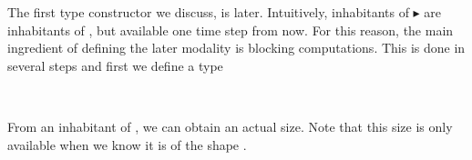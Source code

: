 
The first type constructor we discuss, is later.
Intuitively, inhabitants of $\blacktriangleright$  are inhabitants of , but available one time step from now.
For this reason, the main ingredient of defining the later modality is blocking computations.
This is done in several steps and first we define a type 

\begin{code}%
\>[0]\AgdaSpace{}%
\AgdaSpace{}%
\AgdaSymbol{(}\AgdaSpace{}%
\AgdaSymbol{:}\AgdaSpace{}%
\AgdaSymbol{)}\AgdaSpace{}%
\AgdaSymbol{:}\AgdaSpace{}%
\AgdaSpace{}%
\<%
\\
\>[0][@{}l@{\AgdaIndent{0}}]%
\>[2]\AgdaOperator{\AgdaInductiveConstructor{[\AgdaUnderscore{}]}}\AgdaSpace{}%
\AgdaSymbol{:}\AgdaSpace{}%
\AgdaSymbol{(}\AgdaSpace{}%
\AgdaSymbol{:}\AgdaSpace{}%
\AgdaSpace{}%
\AgdaSymbol{)}\AgdaSpace{}%
\AgdaSpace{}%
\AgdaSpace{}%
\<%
\end{code}

From an inhabitant of , we can obtain an actual size.
Note that this size is only available when we know it is of the shape \IC{[}  \IC{]}.

\begin{code}%
\>[0]\AgdaSpace{}%
\AgdaSymbol{:}\AgdaSpace{}%
\AgdaSpace{}%
\AgdaSymbol{\{}\AgdaSymbol{\}}\AgdaSpace{}%
\AgdaSpace{}%
\AgdaSpace{}%
\AgdaSpace{}%
\AgdaSpace{}%
\<%
\\
\>[0]\AgdaSpace{}%
\AgdaOperator{\AgdaInductiveConstructor{[}}\AgdaSpace{}%
\AgdaSpace{}%
\AgdaOperator{\AgdaInductiveConstructor{]}}\AgdaSpace{}%
\AgdaSymbol{=}\AgdaSpace{}%
\<%
\end{code}

